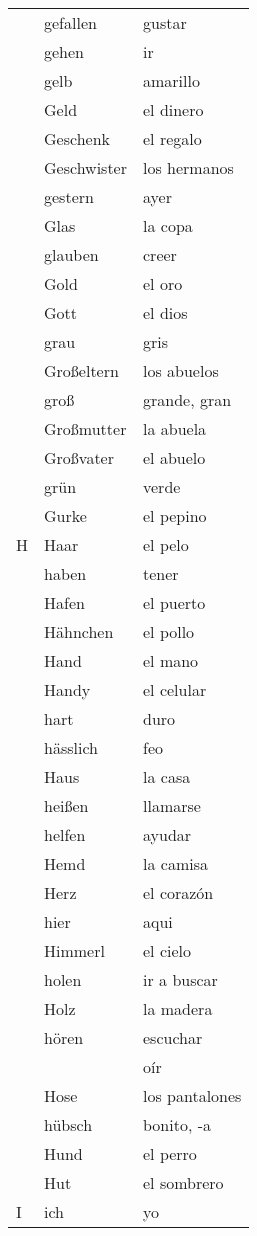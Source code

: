 \documentclass[10pt,spanish]{article}
\begin{document}
\begin{longtable}{p{} p{} | p{}}
& gefallen & gustar  \\
& gehen & ir  \\
& gelb & amarillo  \\
& Geld & el dinero  \\
& Geschenk & el regalo \\
& Geschwister & los hermanos  \\
& gestern & ayer  \\
& Glas & la copa  \\
& glauben & creer \\
& Gold & el oro \\
& Gott & el dios \\
& grau & gris  \\
& Großeltern & los abuelos  \\
& groß & grande, gran  \\
& Großmutter & la abuela  \\
& Großvater & el abuelo  \\
& grün & verde  \\
& Gurke & el pepino \\
H & Haar & el pelo  \\
& haben & tener  \\
& Hafen & el puerto  \\
& Hähnchen & el pollo  \\
& Hand & el mano  \\
& Handy & el celular  \\
& hart & duro  \\
& hässlich & feo \\
& Haus & la casa  \\
& heißen & llamarse \\
& helfen & ayudar  \\
& Hemd & la camisa  \\
& Herz & el corazón \\
& hier & aqui  \\
& Himmerl & el cielo  \\
& holen & ir a buscar  \\
& Holz & la madera  \\
& hören & escuchar \\
& & oír \\
& Hose & los pantalones  \\
& hübsch & bonito, -a \\
& Hund & el perro  \\
& Hut & el sombrero  \\
I & ich & yo  \\

\end{longtable}
\end{document}
